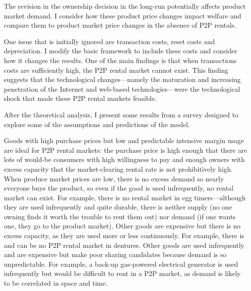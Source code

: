 \documentclass[11pt]{article}
\begin{document}
The revision in the ownership decision in the long-run potentially affects product market demand. 
I consider how these product price changes impact welfare and compare them to product market price changes in the absence of P2P rentals. 

One issue that is initially ignored are transaction costs, reset costs and depreciation. 
I modify the basic framework to include these costs and consider how it changes the results. 
One of the main findings is that when transactions costs are sufficiently high, the P2P rental market cannot exist. 
This finding suggests that the technological changes---namely the maturation and increasing penetration of the Internet and web-based technologies---were the technological shock that made these P2P rental markets feasible. 

After the theoretical analysis, I present some results from a survey designed to explore some of the assumptions and predictions of the model. 

Goods with high purchase prices but low and predictable intensive margin usage are ideal for P2P rental markets: 
the purchase price is high enough that there are lots of would-be consumers with high willingness to pay and enough owners with excess capacity that the market-clearing rental rate is not prohibitively high. 
When produce market prices are low, there is no excess demand so nearly everyone buys the product, so even if the good is used infrequently, no rental market can exist.  
For example, there is no rental market in egg timers---although they are used infrequently and quite durable, there is neither supply (no one owning finds it worth the trouble to rent them out) nor demand (if one wants one, they go to the product market). 
Other goods are expensive but there is no excess capacity, as they are used more or less continuously. 
For example, there is and can be no P2P rental market in dentures. 
Other goods are used infrequently and are expensive but make poor sharing candidates because demand is so unpredictable. 
For example, a back-up gas-powered electrical generator is used infrequently but would be difficult to rent in a P2P market, as demand is likely to be correlated in space and time. 
\end{document}
